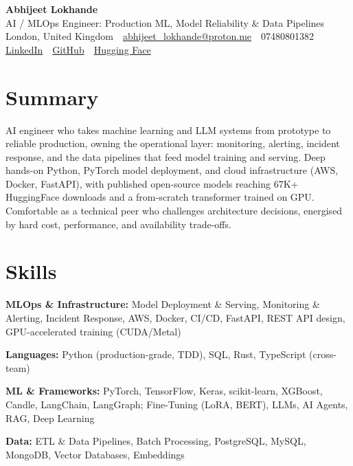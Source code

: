 \documentclass[10pt,a4paper]{article}
\newcommand{\sep}{\,\textcolor{accent!60}{\textbar}\,}
\begin{document}
\begin{center}
  {\fontsize{24}{26}\selectfont\bfseries Abhijeet Lokhande}\\[3pt]
  {\color{accent}\large AI / MLOps Engineer: Production ML, Model Reliability \& Data Pipelines}\\[5pt]
  {\small
    London, United Kingdom \sep
    \href{mailto:abhijeet_lokhande@proton.me}{abhijeet\_lokhande@proton.me} \sep
    07480801382 \\[2pt]
    \href{https://www.linkedin.com/in/ablds/}{LinkedIn} \sep
    \href{https://github.com/abhijeetscode}{GitHub} \sep
    \href{https://huggingface.co/ab-ai}{Hugging Face}
  }
\end{center}
\vspace{2pt}

\section{Summary}
AI engineer who takes machine learning and LLM systems from prototype to reliable production, owning the operational layer: monitoring, alerting, incident response, and the data pipelines that feed model training and serving. Deep hands-on Python, PyTorch model deployment, and cloud infrastructure (AWS, Docker, FastAPI), with published open-source models reaching 67K+ HuggingFace downloads and a from-scratch transformer trained on GPU. Comfortable as a technical peer who challenges architecture decisions, energised by hard cost, performance, and availability trade-offs.

\section{Skills}
\begin{tight}
  \item[\textcolor{accent}{\small$\bullet$}] \textbf{MLOps \& Infrastructure:} Model Deployment \& Serving, Monitoring \& Alerting, Incident Response, AWS, Docker, CI/CD, FastAPI, REST API design, GPU-accelerated training (CUDA/Metal)
  \item[\textcolor{accent}{\small$\bullet$}] \textbf{Languages:} Python (production-grade, TDD), SQL, Rust, TypeScript (cross-team)
  \item[\textcolor{accent}{\small$\bullet$}] \textbf{ML \& Frameworks:} PyTorch, TensorFlow, Keras, scikit-learn, XGBoost, Candle, LangChain, LangGraph; Fine-Tuning (LoRA, BERT), LLMs, AI Agents, RAG, Deep Learning
  \item[\textcolor{accent}{\small$\bullet$}] \textbf{Data:} ETL \& Data Pipelines, Batch Processing, PostgreSQL, MySQL, MongoDB, Vector Databases, Embeddings
\end{tight}
\end{document}
